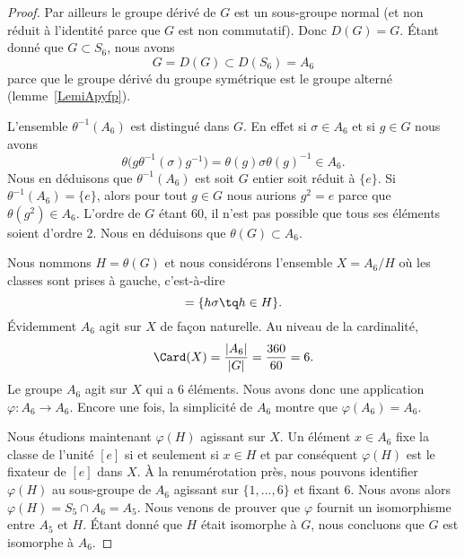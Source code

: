 \begin{proof}
	Par ailleurs le groupe dérivé de \( G\) est un sous-groupe normal (et non réduit à l'identité parce que \( G\) est non commutatif). Donc \( D(G)=G\). Étant donné que \( G\subset S_6\), nous avons
	\begin{equation}
		G=D(G)\subset D(S_6)=A_6
	\end{equation}
	parce que le groupe dérivé du groupe symétrique est le groupe alterné (lemme~\ref{LemiApyfp}).

	L'ensemble \( \theta^{-1}(A_6)\) est distingué dans \( G\). En effet si \( \sigma\in A_6\) et si \( g\in G\) nous avons
	\begin{equation}
		\theta\big( g\theta^{-1}(\sigma)g^{-1} \big)=\theta(g)\sigma \theta(g)^{-1}\in A_6.
	\end{equation}
	Nous en déduisons que \( \theta^{-1}(A_6)\) est soit \( G\) entier soit réduit à \( \{ e \}\). Si \( \theta^{-1}(A_6)=\{ e \}\), alors pour tout \( g\in G\) nous aurions \( g^2=e\) parce que \( \theta(g^2)\in A_6\). L'ordre de \( G\) étant \( 60\), il n'est pas possible que tous ses éléments soient d'ordre \( 2\). Nous en déduisons que \( \theta(G)\subset A_6\).

	Nous nommons \( H=\theta(G)\) et nous considérons l'ensemble \( X=A_6/H\) où les classes sont prises à gauche, c'est-à-dire
	\begin{equation}
		[\sigma]=\{ h\sigma\tq h\in H \}.
	\end{equation}
	Évidemment \( A_6\) agit sur \( X\) de façon naturelle. Au niveau de la cardinalité,
	\begin{equation}
		\Card(X)=\frac{ | A_6 | }{ | G | }=\frac{ 360 }{ 60 }=6.
	\end{equation}
	Le groupe \( A_6\) agit sur \( X\) qui a \( 6\) éléments. Nous avons donc une application \( \varphi\colon A_6\to A_6\). Encore une fois, la simplicité de \( A_6\) montre que \( \varphi(A_6)=A_6\).

	Nous étudions maintenant \( \varphi(H)\) agissant sur \( X\). Un élément \( x\in A_6\) fixe la classe de l'unité \( [e]\) si et seulement si \( x\in H\) et par conséquent \( \varphi(H)\) est le fixateur de \( [e]\) dans \( X\). À la renumérotation près, nous pouvons identifier \( \varphi(H)\) au sous-groupe de \( A_6\) agissant sur \( \{ 1,\ldots, 6 \}\) et fixant \( 6\). Nous avons alors \( \varphi(H)=S_5\cap A_6=A_5\). Nous venons de prouver que \( \varphi\) fournit un isomorphisme entre \( A_5\) et \( H\). Étant donné que \( H\) était isomorphe à \( G\), nous concluons que \( G\) est isomorphe à \( A_6\).
\end{proof}

